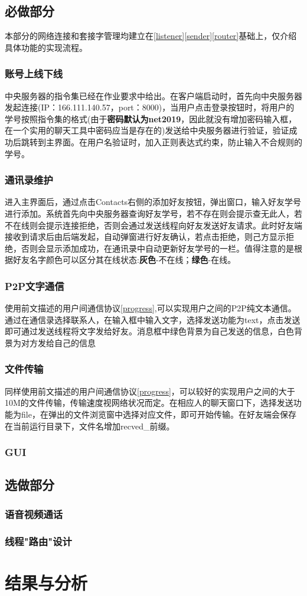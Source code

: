 \documentclass[UTF8]{ctexart}
\begin{document}
\subsection{必做部分}
本部分的网络连接和套接字管理均建立在\ref{listener}\ref{sender}\ref{router}基础上，仅介绍具体功能的实现流程。
\subsubsection{账号上线下线}
中央服务器的指令集已经在作业要求中给出。在客户端启动时，首先向中央服务器发起连接(IP：166.111.140.57，port：8000)，当用户点击登录按钮时，将用户的学号按照指令集的格式(由于\textbf{密码默认为net2019}，因此就没有增加密码输入框，在一个实用的聊天工具中密码应当是存在的)发送给中央服务器进行验证，验证成功后跳转到主界面。在用户名验证时，加入正则表达式约束，防止输入不合规则的学号。
\subsubsection{通讯录维护}
进入主界面后，通过点击Contacts右侧的添加好友按钮，弹出窗口，输入好友学号进行添加。系统首先向中央服务器查询好友学号，若不存在则会提示查无此人，若不在线则会提示连接拒绝，否则会通过发送线程向好友发送好友请求。此时好友端接收到请求后由后端发起，自动弹窗进行好友确认，若点击拒绝，则己方显示拒绝，否则会显示添加成功，在通讯录中自动更新好友学号的一栏。值得注意的是根据好友名字颜色可以区分其在线状态:\textbf{灰色}-不在线；\textbf{绿色}-在线。
\subsubsection{P2P文字通信}
使用前文描述的用户间通信协议\ref{progress},可以实现用户之间的P2P纯文本通信。通过在通信录选择联系人，在输入框中输入文字，选择发送功能为text，点击发送即可通过发送线程将文字发给好友。消息框中绿色背景为自己发送的信息，白色背景为对方发给自己的信息

\subsubsection{文件传输}
同样使用前文描述的用户间通信协议\ref{progress}，可以较好的实现用户之间的大于10M的文件传输，传输速度视网络状况而定。在相应人的聊天窗口下，选择发送功能为file，在弹出的文件浏览窗中选择对应文件，即可开始传输。在好友端会保存在当前运行目录下，文件名增加recved\_前缀。
\subsubsection{GUI}
\subsection{选做部分}
\subsubsection{语音视频通话}
\subsubsection{线程"路由"设计}

\section{结果与分析}
\end{document}

